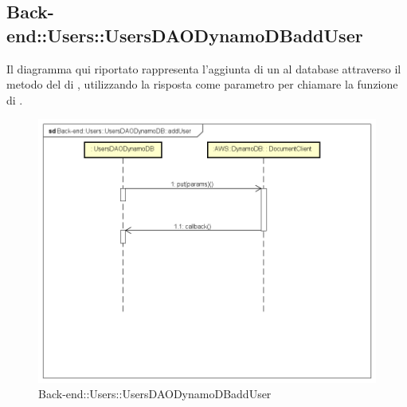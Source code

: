 \subsection{Back-end::Users::UsersDAODynamoDBaddUser}
Il diagramma qui riportato rappresenta l'aggiunta di un  al database attraverso il metodo  del  di , utilizzando la risposta come parametro per chiamare la funzione di .
\begin{figure}[h] \centering \includegraphics[width=\textwidth,height=\textheight,keepaspectratio]{images/diagrams/back-end/Ufficial_Backend/Back-endUsersUsersDAODynamoDBaddUser.png} 	\caption{Back-end::Users::UsersDAODynamoDBaddUser}
\end{figure}
\newpage
